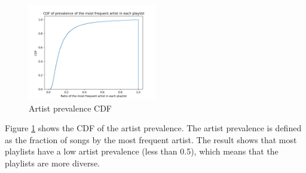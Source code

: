 \documentclass[11pt,letterpaper]{article}
\begin{document}

\begin{figure}[!htbp]
    \centering
    \includegraphics[width=0.5\textwidth]{data/artist_prevalence_cdf.png}
    \caption{Artist prevalence CDF}
    \label{fig:artist_prevalence_cdf}
\end{figure}

Figure \ref{fig:artist_prevalence_cdf} shows the CDF of the artist prevalence. The artist prevalence is defined as the fraction of songs by the most frequent artist. The result shows that most playlists have a low artist prevalence (less than 0.5), which means that the playlists are more diverse.
\end{document}
